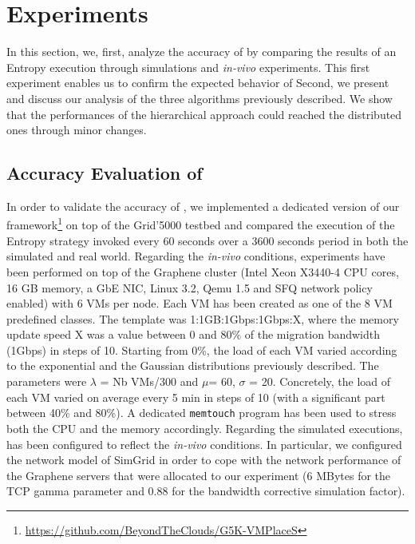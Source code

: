 \section{Experiments}
\label{sec:experiments}
In this section, we, first, analyze the accuracy of \vmps by comparing
the  results of an Entropy execution through simulations and
\textit{in-vivo} experiments. This first experiment enables us to
confirm the expected behavior of \vmps Second, we present and discuss
our analysis of the three algorithms previously described.
We show that the performances of the hierarchical approach could
reached the distributed ones through minor changes.

\subsection{Accuracy Evaluation of \vmps}
\label{subsec:accuracy}
In order to validate the accuracy of \vmps, we implemented a dedicated
version of our
framework\footnote{\url{https://github.com/BeyondTheClouds/G5K-VMPlaceS}}
on top of the Grid'5000 testbed and compared the execution of the
Entropy strategy invoked every 60 seconds over a 3600 seconds period
in both the simulated and real world. Regarding the \textit{in-vivo}
conditions, experiments have been performed on top of the Graphene
cluster (Intel Xeon X3440-4 CPU cores, 16 GB memory, a GbE NIC, Linux
3.2, Qemu 1.5 and SFQ network policy enabled) with 6 VMs per node.
Each VM has been created as one of the 8 VM predefined classes. The
template was 1:1GB:1Gbps:1Gbps:X, where the memory update speed X was
a value between 0 and 80\% of the migration bandwidth (1Gbps) in steps
of 10. Starting from 0\%, the load of each VM varied according to the
exponential and the Gaussian distributions previously described. The
parameters were $\lambda$ = Nb VMs/300 and $\mu$= 60, $\sigma$ = 20.
Concretely, the load of each VM varied on average every 5 min in steps
of 10 (with a significant part between 40\% and 80\%). A dedicated
\texttt{memtouch} program\cite{Hirofuchi:2013:ALM:2568486.2568524} has
been used to stress both the CPU and the memory accordingly. Regarding
the simulated executions, \vmps has been configured to reflect the
\textit{in-vivo} conditions. In particular, we configured the network model of
SimGrid in order to cope with the network performance of the Graphene
servers that were allocated to our experiment (6 MBytes for the TCP
gamma parameter and 0.88 for the bandwidth corrective simulation
factor).

